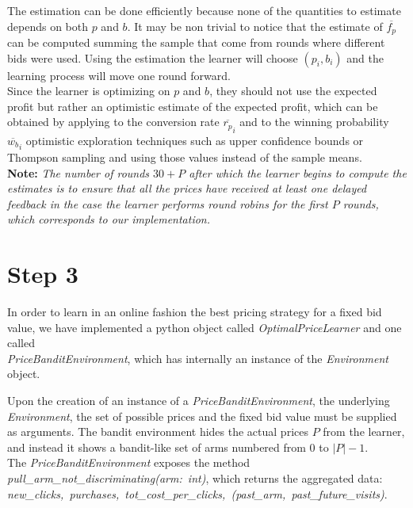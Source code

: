 \documentclass[11pt]{article} %
\begin{document}
The estimation can be done efficiently because none of the quantities to estimate depends on both $p$ and $b$. {\color{red}It may be non trivial to notice that the estimate of $\overline{f_p}$ can be computed summing the sample that come from rounds where different bids were used}. Using the estimation the learner will choose $(p_i,b_i)$ and the learning process will move one round forward.\\
Since the learner is optimizing on $p$ and $b$, they should not use the expected profit but rather an optimistic estimate of the expected profit, which can be obtained by applying to the conversion rate $\overline{r_p}_i$ and to the winning probability $\overline{w_b}_i$ optimistic exploration techniques such as upper confidence bounds or Thompson sampling and using those values instead of the sample means.\\

\textbf{Note:} \textit{The number of rounds $30+P$ after which the learner begins to compute the estimates is to ensure that all the prices have received at least one delayed feedback in the case the learner performs round robins for the first $P$ rounds, which corresponds to our implementation.}


\clearpage
\section{Step 3}
In order to learn in an online fashion the best pricing strategy for a fixed bid value, we have implemented a python object called \textit{OptimalPriceLearner} and one called\\ \textit{PriceBanditEnvironment}, which has internally an instance of the \textit{Environment} object. 

Upon the creation of an instance of a \textit{PriceBanditEnvironment}, the underlying\\ \textit{Environment}, the set of possible prices and the fixed bid value must be supplied as arguments. The bandit environment hides the actual prices $P$ from the learner, and instead it shows a bandit-like set of arms numbered from $0$ to $|P|-1$.\\

The \textit{PriceBanditEnvironment} exposes the method \mbox{\textit{pull\_arm\_not\_discriminating(arm: int)}}, which returns the aggregated data:\\
\mbox{\textit{new\_clicks, purchases, tot\_cost\_per\_clicks, (past\_arm, past\_future\_visits)}}.\\
\end{document}
